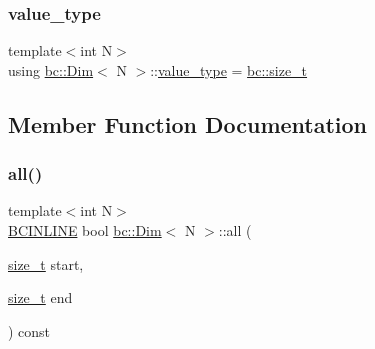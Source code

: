 \mbox{\label{structbc_1_1Dim_af59ff554825273cf6bd9619b2c78c196}} 
\subsubsection{\texorpdfstring{value\+\_\+type}{value\_type}}
{\footnotesize\ttfamily template$<$int N$>$ \\
using \hyperlink{structbc_1_1Dim}{bc\+::\+Dim}$<$ N $>$\+::\hyperlink{structbc_1_1Dim_af59ff554825273cf6bd9619b2c78c196}{value\+\_\+type} =  \hyperlink{namespacebc_aaf8e3fbf99b04b1b57c4f80c6f55d3c5}{bc\+::size\+\_\+t}}



\subsection{Member Function Documentation}
\mbox{\label{structbc_1_1Dim_a196ebadfaf384a49d423fe75be5447d1}} 
\subsubsection{\texorpdfstring{all()}{all()}\hspace{0.1cm}{\footnotesize\ttfamily [1/2]}}
{\footnotesize\ttfamily template$<$int N$>$ \\
\hyperlink{common_8h_a6699e8b0449da5c0fafb878e59c1d4b1}{B\+C\+I\+N\+L\+I\+NE} bool \hyperlink{structbc_1_1Dim}{bc\+::\+Dim}$<$ N $>$\+::all (\begin{DoxyParamCaption}\item[{\hyperlink{structbc_1_1Dim_a8c7c7ae0cd96c3923e76097089747290}{size\+\_\+t}}]{start,  }\item[{\hyperlink{structbc_1_1Dim_a8c7c7ae0cd96c3923e76097089747290}{size\+\_\+t}}]{end }\end{DoxyParamCaption}) const\hspace{0.3cm}{\ttfamily [inline]}}

\mbox{\label{structbc_1_1Dim_aa380b2a7110b827a3813bdfe50151c5f}} 
